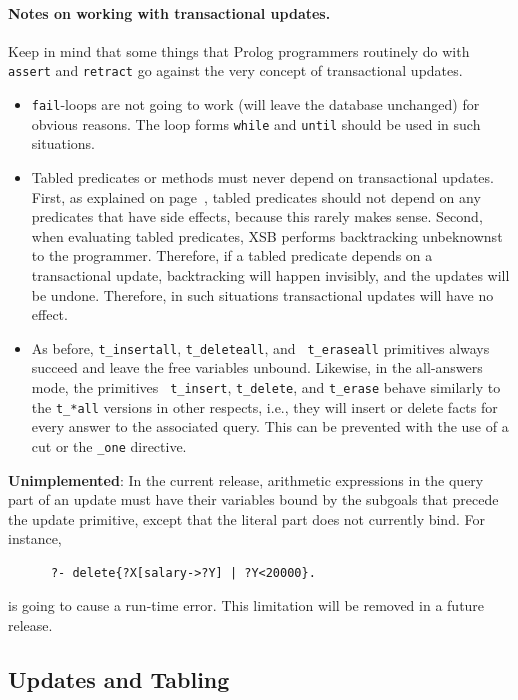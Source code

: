 \documentclass[11pt]{article}
\begin{document}
\paragraph{Notes on working with transactional updates.}
Keep in mind that some things that Prolog programmers routinely do with
{\tt assert} and {\tt retract} go against the very concept of
transactional updates.
\begin{itemize}
  \item
    {\tt fail}-loops are not going to
    work (will leave the database unchanged) for obvious reasons. The loop forms
    {\tt while} and {\tt until} should be used in such situations.
  \item Tabled predicates or methods must never depend on transactional
    updates. First, as explained on page~\pageref{page-depchk},
    tabled predicates should not depend on any predicates that have side
    effects, because this rarely makes sense. Second, when evaluating
    tabled predicates, XSB performs backtracking unbeknownst to the
    programmer. Therefore, if a tabled predicate depends on a
    transactional update, backtracking will happen invisibly, and the
    updates will be undone. Therefore, in such situations transactional
    updates will have no effect.
    
  \item As before, {\tt t\_insertall}, {\tt t\_deleteall}, and {\tt
      t\_eraseall} primitives always succeed and leave the free variables
    unbound.  Likewise, in the all-answers mode, the primitives {\tt
      t\_insert}, {\tt t\_delete}, and {\tt t\_erase} behave similarly to the
    {\tt t\_*all} versions in other respects, i.e., they will insert
    or delete facts for every answer to the associated query. This can be
    prevented with the use of a cut or the {\tt \_one} directive.
\end{itemize}

\noindent
{\bf Unimplemented}: In the current release, arithmetic expressions in the
query part of an update must have their variables bound by the subgoals
that precede the update primitive, except that the literal part does not
currently bind. For instance, 
\begin{verbatim}
      ?- delete{?X[salary->?Y] | ?Y<20000}.
\end{verbatim}
is going to cause a run-time error. This limitation will be removed in a
future release.


\subsection{Updates and Tabling}\label{sec-updates-tabling}
\end{document}
